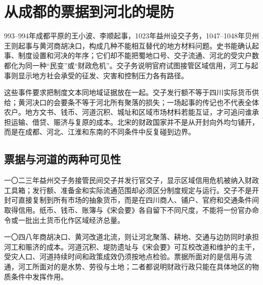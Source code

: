 \section{从成都的票据到河北的堤防}

993--994年成都平原的王小波、李顺起事，1023年益州设交子务，1047--1048年贝州王则起事与黄河商胡决口，构成几种不能相互替代的地方材料问题。史书能确认起事、制度设置和河决的年序；它们却不能把蜀地口号、交子流通、河北的受灾户数都化为同一种“民变”或“财政危机”。交子务说明官府试图接管区域信用，河工与起事则显示地方社会承受的征发、灾害和控制压力各有路径。

这些事件要求把制度文本同地域证据放在一起。交子发行额不等于四川实际货币供给；黄河决口的会要条不等于河北所有聚落的损失；一场起事的传记也不代表全体农户。地方文书、钱币、河道沉积、城址和区域市场材料若能互证，才可追问谁承担运输、借贷、赈济与复原的成本。北宋的财政国家并不是从开封向外均匀铺开，而是在成都、河北、江淮和东南的不同条件中反复碰到边界。

\subsection{票据与河道的两种可见性}

一〇二三年益州交子务接管民间交子并发行官交子，显示区域信用危机被纳入财政工具箱；发行额、准备金和实际流通范围却必须区分制度规定与运行。交子不是开封可直接复制到所有市场的抽象货币，而是在四川商人、铺户、官府和交通条件间取得信用。纸币、钱币、账簿与《宋会要》各自留下不同尺度，不能将一份官办命令或一批出土货币化作区域经济总量。

一〇四八年商胡决口、黄河改道北流，则让河北聚落、耕地、交通与边防同时承担河工和赈济的成本。河道沉积、堤防遗址与《宋会要》可互校改道和维护的主干，受灾人口、河道持续时间和政策成效仍须按地点检验。票据所面对的是信用与流通，河工所面对的是水势、劳役与土地；二者都说明财政行政只能在具体地区的物质条件中发挥作用。
